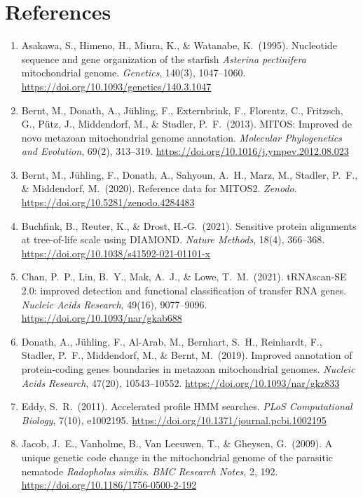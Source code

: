 \documentclass[11pt, a4paper]{article}
\begin{document}
\section*{References}
\begin{enumerate}[label={}, leftmargin=1.5em, itemindent=-1.5em, itemsep=0.3em, parsep=0pt]
\small
\item Asakawa, S., Himeno, H., Miura, K., \& Watanabe, K.\ (1995). Nucleotide sequence and gene organization of the starfish \textit{Asterina pectinifera} mitochondrial genome. \textit{Genetics}, 140(3), 1047--1060. \url{https://doi.org/10.1093/genetics/140.3.1047}
\item Bernt, M., Donath, A., Jühling, F., Externbrink, F., Florentz, C., Fritzsch, G., Pütz, J., Middendorf, M., \& Stadler, P.\ F.\ (2013). MITOS: Improved de novo metazoan mitochondrial genome annotation. \textit{Molecular Phylogenetics and Evolution}, 69(2), 313--319. \url{https://doi.org/10.1016/j.ympev.2012.08.023}
\item Bernt, M., Jühling, F., Donath, A., Sahyoun, A.\ H., Marz, M., Stadler, P.\ F., \& Middendorf, M.\ (2020). Reference data for MITOS2. \textit{Zenodo}. \url{https://doi.org/10.5281/zenodo.4284483}
\item Buchfink, B., Reuter, K., \& Drost, H.-G.\ (2021). Sensitive protein alignments at tree-of-life scale using DIAMOND. \textit{Nature Methods}, 18(4), 366--368. \url{https://doi.org/10.1038/s41592-021-01101-x}
\item Chan, P.\ P., Lin, B.\ Y., Mak, A.\ J., \& Lowe, T.\ M.\ (2021). tRNAscan-SE 2.0: improved detection and functional classification of transfer RNA genes. \textit{Nucleic Acids Research}, 49(16), 9077--9096. \url{https://doi.org/10.1093/nar/gkab688}
\item Donath, A., Jühling, F., Al-Arab, M., Bernhart, S.\ H., Reinhardt, F., Stadler, P.\ F., Middendorf, M., \& Bernt, M.\ (2019). Improved annotation of protein-coding genes boundaries in metazoan mitochondrial genomes. \textit{Nucleic Acids Research}, 47(20), 10543--10552. \url{https://doi.org/10.1093/nar/gkz833}
\item Eddy, S.\ R.\ (2011). Accelerated profile HMM searches. \textit{PLoS Computational Biology}, 7(10), e1002195. \url{https://doi.org/10.1371/journal.pcbi.1002195}
\item Jacob, J.\ E., Vanholme, B., Van Leeuwen, T., \& Gheysen, G.\ (2009). A unique genetic code change in the mitochondrial genome of the parasitic nematode \textit{Radopholus similis}. \textit{BMC Research Notes}, 2, 192. \url{https://doi.org/10.1186/1756-0500-2-192}

\end{enumerate}
\end{document}
